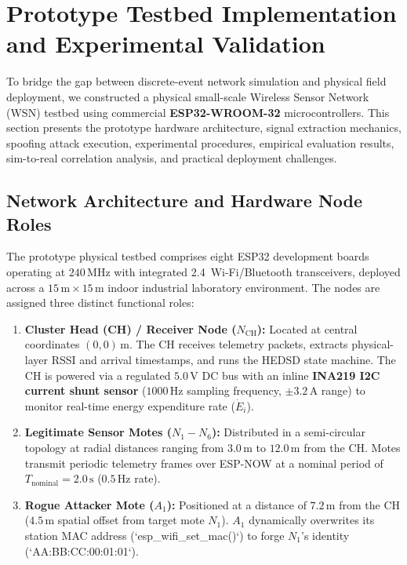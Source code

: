 \section{Prototype Testbed Implementation and Experimental Validation}
\label{sec:testbed_validation}

To bridge the gap between discrete-event network simulation and physical field deployment, we constructed a physical small-scale Wireless Sensor Network (\ac{WSN}) testbed using commercial \textbf{ESP32-WROOM-32} microcontrollers. This section presents the prototype hardware architecture, signal extraction mechanics, spoofing attack execution, experimental procedures, empirical evaluation results, sim-to-real correlation analysis, and practical deployment challenges.

\subsection{Network Architecture and Hardware Node Roles}
The prototype physical testbed comprises eight ESP32 development boards operating at $240\,\text{MHz}$ with integrated 2.4\, Wi-Fi/Bluetooth transceivers, deployed across a $15\,\text{m} \times 15\,\text{m}$ indoor industrial laboratory environment. The nodes are assigned three distinct functional roles:
\begin{enumerate}
    \item \textbf{Cluster Head (CH) / Receiver Node ($N_{\text{CH}}$):} Located at central coordinates $(0, 0)\,\text{m}$. The CH receives telemetry packets, extracts physical-layer \ac{RSSI} and arrival timestamps, and runs the \ac{HEDSD} state machine. The CH is powered via a regulated $5.0\,\text{V}$ DC bus with an inline \textbf{INA219 I2C current shunt sensor} ($1000\,\text{Hz}$ sampling frequency, $\pm 3.2\,\text{A}$ range) to monitor real-time energy expenditure rate ($\dot{E}_i$).
    \item \textbf{Legitimate Sensor Motes ($N_1 - N_6$):} Distributed in a semi-circular topology at radial distances ranging from $3.0\,\text{m}$ to $12.0\,\text{m}$ from the CH. Motes transmit periodic telemetry frames over ESP-NOW at a nominal period of $T_{\text{nominal}} = 2.0\,\text{s}$ ($0.5\,\text{Hz}$ rate).
    \item \textbf{Rogue Attacker Mote ($A_1$):} Positioned at a distance of $7.2\,\text{m}$ from the CH ($4.5\,\text{m}$ spatial offset from target mote $N_1$). $A_1$ dynamically overwrites its station \ac{MAC} address (`esp_wifi_set_mac()`) to forge $N_1$'s identity (`AA:BB:CC:00:01:01`).
\end{enumerate}


